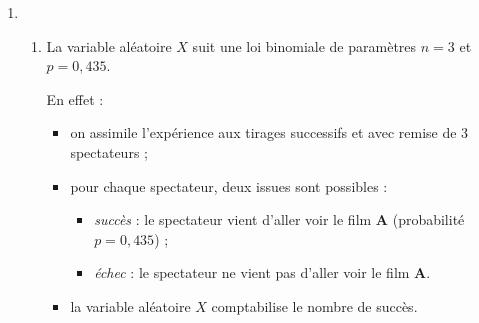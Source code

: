 \begin{corrige}
\begin{enumerate}
{               \par
               Dans le cas présent, on sait que l'événement $A$ est vérifié et on souhaite déterminer la probabilité de l'événement $R$. On recherche donc $p_A(R)$.
          }
          \par
          D'après la formule des probabilités conditionnelles :
          \par
          $p_A(R)=\dfrac{p(A\cap R)}{p(A)}=\dfrac{0,3 \times 0,4}{0,435}$\nosp$=\dfrac{0,12}{0,435} \approx 0,276\ $ (à $10^{-3}$ près).
          \item %
          \begin{enumerate}
               \item %
               La variable aléatoire $X$ suit une loi binomiale de paramètres ${n=3}$ et ${p=0,435}$.
               \par
               En effet :
               \par
               \begin{itemize}
                    \item on assimile l'expérience aux tirages successifs et avec remise de 3 spectateurs ;
                    \item pour chaque spectateur, deux issues sont possibles :
                    \begin{itemize}
                         \item \textit{succès} : le spectateur vient d'aller voir le film \textbf{A} (probabilité $p=0,435$) ;
                         \item \textit{échec} : le spectateur ne vient pas d'aller voir le film \textbf{A}.
                    \end{itemize}
                    \item la variable aléatoire $X$ comptabilise le nombre de succès.
               \end{itemize}

\end{enumerate}
\end{enumerate}
\end{corrige}
